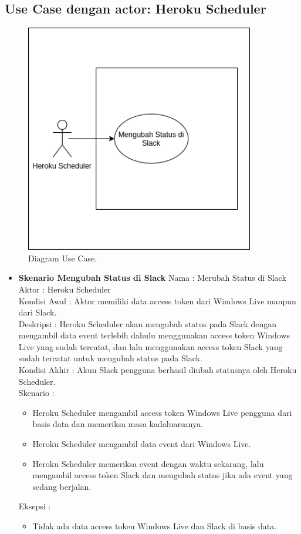 \subsection{Use Case dengan actor: Heroku Scheduler}
\begin{figure}[h]
  \includegraphics[width=10cm]{./Gambar/usecase2.png}
  \centering
  \caption{Diagram Use Case.}
  \label{fig:usecase_heroku}
\end{figure}
\begin{itemize}
\item \textbf{Skenario Mengubah Status di Slack}
    Nama : Merubah Status di Slack\\
    Aktor : Heroku Scheduler\\
    Kondisi Awal : Aktor memiliki data access token dari Windows Live maupun dari Slack. \\
    Deskripsi : Heroku Scheduler akan mengubah status pada Slack dengan mengambil data event terlebih dahulu menggunakan access token Windows Live yang sudah tercatat, dan lalu menggunakan access token Slack yang sudah tercatat untuk mengubah status pada Slack.\\
    Kondisi Akhir : Akun Slack pengguna berhasil diubah statusnya oleh Heroku Scheduler. \\
    Skenario : 
    \begin{itemize}
        \item Heroku Scheduler mengambil access token Windows Live pengguna dari basis data dan memeriksa masa kadaluarsanya. 
        \item Heroku Scheduler mengambil data event dari Windows Live. 
        \item Heroku Scheduler memeriksa event dengan waktu sekarang, lalu mengambil access token Slack dan mengubah status jika ada event yang sedang berjalan.
    \end{itemize}
    Eksepsi : 
    \begin{itemize}
        \item Tidak ada data access token Windows Live dan Slack di basis data. 
    \end{itemize}
    
\end{itemize}

